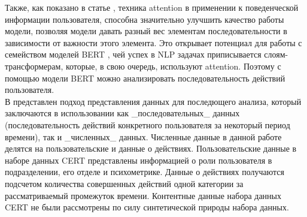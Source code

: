 
Также, как показано в статье \cite{yuanAttentionBasedLSTMInsider2019}, техника attention в применении к поведенческой информации пользователя, способна значительно улучшить качество работы модели, позволяя модели давать разный вес элементам последовательности в зависимости от важности этого элемента. Это открывает потенциал для работы с семейством моделей BERT \cite{devlinBERTPretrainingDeep2019}, чей успех в NLP задачах приписывается слоям-трансформерам, которые, в свою очередь, используют attention. Поэтому с помощью модели BERT можно анализировать последовательность действий пользователя.\\

В \cite{leEvaluatingInsiderThreat2018} представлен подход представления данных для последющего анализа, который заключаются в использовании как _последовательных_ данных (последовательность действий конкретного пользователя за некоторый период времени), так и _численных_ данных. Численные данные в данной работе делятся на пользовательские и данные о действиях. Пользовательские данные в наборе данных CERT представлены информацией о роли пользователя в подразделении, его отделе и психометрике. Данные о действиях получаются подсчетом количества совершенных действий одной категории за рассматриваемый промежуток времени. Контентные данные набора данных CERT не были рассмотрены по силу синтетической природы набора данных.

